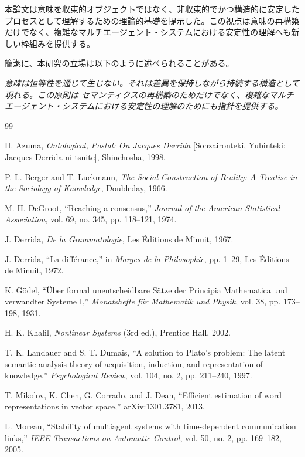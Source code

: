 \documentclass[11pt,a4paper]{article}
\theoremstyle{definition}
\begin{document}
本論文は意味を収束的オブジェクトではなく、非収束的でかつ構造的に安定したプロセスとして理解するための理論的基礎を提示した。この視点は意味の再構築だけでなく、複雑なマルチエージェント・システムにおける安定性の理解へも新しい枠組みを提供する。

簡潔に、本研究の立場は以下のように述べられることがある。

\textit{意味は恒等性を通じて生じない。それは差異を保持しながら持続する構造として現れる。この原則は セマンティクスの再構築のためだけでなく、複雑なマルチエージェント・システムにおける安定性の理解のためにも指針を提供する。}

\begin{thebibliography}{99}

 H. Azuma, \textit{Ontological, Postal: On Jacques Derrida} [Sonzaironteki, Yubinteki: Jacques Derrida ni tsuite], Shinchosha, 1998.

 P. L. Berger and T. Luckmann, \textit{The Social Construction of Reality: A Treatise in the Sociology of Knowledge}, Doubleday, 1966.

 M. H. DeGroot, ``Reaching a consensus,'' \textit{Journal of the American Statistical Association}, vol. 69, no. 345, pp. 118--121, 1974.

 J. Derrida, \textit{De la Grammatologie}, Les Éditions de Minuit, 1967.

 J. Derrida, ``La différance,'' in \textit{Marges de la Philosophie}, pp. 1--29, Les Éditions de Minuit, 1972.

 K. Gödel, ``Über formal unentscheidbare Sätze der Principia Mathematica und verwandter Systeme I,'' \textit{Monatshefte für Mathematik und Physik}, vol. 38, pp. 173--198, 1931.

 H. K. Khalil, \textit{Nonlinear Systems} (3rd ed.), Prentice Hall, 2002.

 T. K. Landauer and S. T. Dumais, ``A solution to Plato's problem: The latent semantic analysis theory of acquisition, induction, and representation of knowledge,'' \textit{Psychological Review}, vol. 104, no. 2, pp. 211--240, 1997.

 T. Mikolov, K. Chen, G. Corrado, and J. Dean, ``Efficient estimation of word representations in vector space,'' arXiv:1301.3781, 2013.

 L. Moreau, ``Stability of multiagent systems with time-dependent communication links,'' \textit{IEEE Transactions on Automatic Control}, vol. 50, no. 2, pp. 169--182, 2005.


\end{thebibliography}
\end{document}
